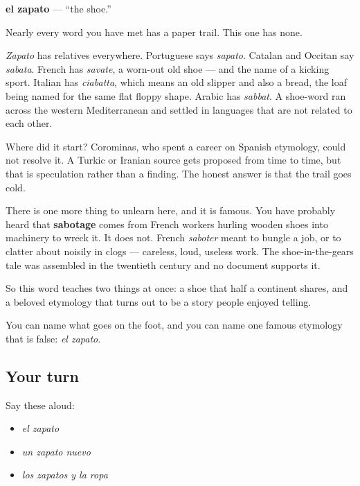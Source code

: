 \begin{cousinweb}
\textbf{el zapato} — \textquotedblleft{}the shoe.\textquotedblright{}

Nearly every word you have met has a paper trail. This one has none.

\emph{Zapato} has relatives everywhere. Portuguese says \emph{sapato}. Catalan and Occitan say \emph{sabata}. French has \emph{savate}, a worn-out old shoe — and the name of a kicking sport. Italian has \emph{ciabatta}, which means an old slipper and also a bread, the loaf being named for the same flat floppy shape. Arabic has \emph{sabbat}. A shoe-word ran across the western Mediterranean and settled in languages that are not related to each other.

Where did it start? Corominas, who spent a career on Spanish etymology, could not resolve it. A Turkic or Iranian source gets proposed from time to time, but that is speculation rather than a finding. The honest answer is that the trail goes cold.

There is one more thing to unlearn here, and it is famous. You have probably heard that \textbf{sabotage} comes from French workers hurling wooden shoes into machinery to wreck it. It does not. French \emph{saboter} meant to bungle a job, or to clatter about noisily in clogs — careless, loud, useless work. The shoe-in-the-gears tale was assembled in the twentieth century and no document supports it.

So this word teaches two things at once: a shoe that half a continent shares, and a beloved etymology that turns out to be a story people enjoyed telling.
\end{cousinweb}

\begin{grammarlens}[title={What you've built}]
You can name what goes on the foot, and you can name one famous etymology that is false: \emph{el zapato}.
\end{grammarlens}

\subsection*{Your turn}
Say these aloud:

\begin{itemize}
\raggedright
  \item \emph{el zapato}
  \item \emph{un zapato nuevo}
  \item \emph{los zapatos y la ropa}
\end{itemize}

